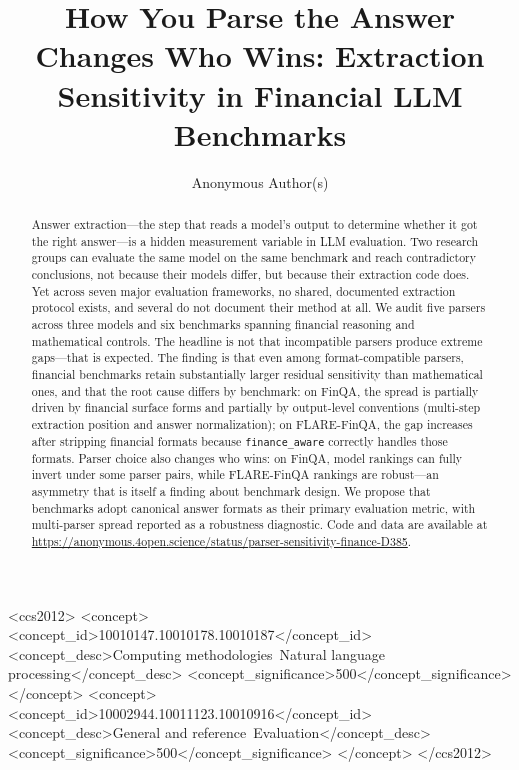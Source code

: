 \documentclass[sigconf,review]{acmart}
\begin{document}
\title{How You Parse the Answer Changes Who Wins: Extraction Sensitivity in Financial LLM Benchmarks}

\author{Anonymous Author(s)}

\begin{abstract}
Answer extraction---the step that reads a model's output to determine whether it got the right answer---is a hidden measurement variable in LLM evaluation. Two research groups can evaluate the same model on the same benchmark and reach contradictory conclusions, not because their models differ, but because their extraction code does. Yet across seven major evaluation frameworks, no shared, documented extraction protocol exists, and several do not document their method at all. We audit five parsers across three models and six benchmarks spanning financial reasoning and mathematical controls. The headline is not that incompatible parsers produce extreme gaps---that is expected. The finding is that even among format-compatible parsers, financial benchmarks retain substantially larger residual sensitivity than mathematical ones, and that the root cause differs by benchmark: on FinQA, the spread is partially driven by financial surface forms and partially by output-level conventions (multi-step extraction position and answer normalization); on FLARE-FinQA, the gap increases after stripping financial formats because \texttt{finance\_aware} correctly handles those formats. Parser choice also changes who wins: on FinQA, model rankings can fully invert under some parser pairs, while FLARE-FinQA rankings are robust---an asymmetry that is itself a finding about benchmark design. We propose that benchmarks adopt canonical answer formats as their primary evaluation metric, with multi-parser spread reported as a robustness diagnostic. Code and data are available at \url{https://anonymous.4open.science/status/parser-sensitivity-finance-D385}.
\end{abstract}

\begin{CCSXML}
<ccs2012>
   <concept>
       <concept_id>10010147.10010178.10010187</concept_id>
       <concept_desc>Computing methodologies~Natural language processing</concept_desc>
       <concept_significance>500</concept_significance>
   </concept>
   <concept>
       <concept_id>10002944.10011123.10010916</concept_id>
       <concept_desc>General and reference~Evaluation</concept_desc>
       <concept_significance>500</concept_significance>
   </concept>
</ccs2012>
\end{CCSXML}
\end{document}
